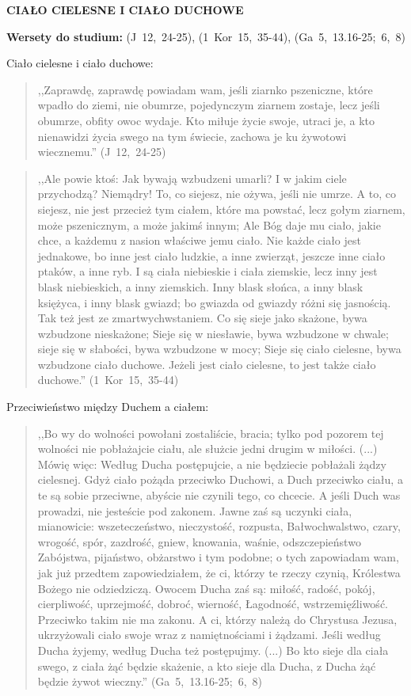 \documentclass[10pt,a4paper,oneside]{article}
\begin{document}
\centerline{\textbf{\MakeUppercase{Ciało cielesne i ciało duchowe}}}
\begin{center}
\textbf{Wersety do studium:} \mbox{(J 12, 24-25)}, \mbox{(1 Kor 15, 35-44)}, \mbox{(Ga 5, 13.16-25; 6, 8)}
\end{center}
Ciało cielesne i ciało duchowe:
\begin{quote}
,,Zaprawdę, zaprawdę powiadam wam, jeśli ziarnko pszeniczne, które wpadło do ziemi, nie obumrze, pojedynczym ziarnem zostaje, lecz jeśli obumrze, obfity owoc wydaje. Kto miłuje życie swoje, utraci je, a kto nienawidzi życia swego na tym świecie, zachowa je ku żywotowi wiecznemu.'' \mbox{(J 12, 24-25)}
\end{quote}
\begin{quote}
,,Ale powie ktoś: Jak bywają wzbudzeni umarli? I w jakim ciele przychodzą? Niemądry! To, co siejesz, nie ożywa, jeśli nie umrze. A to, co siejesz, nie jest przecież tym ciałem, które ma powstać, lecz gołym ziarnem, może pszenicznym, a może jakimś innym; Ale Bóg daje mu ciało, jakie chce, a każdemu z nasion właściwe jemu ciało. Nie każde ciało jest jednakowe, bo inne jest ciało ludzkie, a inne zwierząt, jeszcze inne ciało ptaków, a inne ryb. I są ciała niebieskie i ciała ziemskie, lecz inny jest blask niebieskich, a inny ziemskich. Inny blask słońca, a inny blask księżyca, i inny blask gwiazd; bo gwiazda od gwiazdy różni się jasnością. Tak też jest ze zmartwychwstaniem. Co się sieje jako skażone, bywa wzbudzone nieskażone; Sieje się w niesławie, bywa wzbudzone w chwale; sieje się w słabości, bywa wzbudzone w mocy; Sieje się ciało cielesne, bywa wzbudzone ciało duchowe. Jeżeli jest ciało cielesne, to jest także ciało duchowe.'' \mbox{(1 Kor 15, 35-44)}
\end{quote}

Przeciwieństwo między Duchem a ciałem:
\begin{quote}
,,Bo wy do wolności powołani zostaliście, bracia; tylko pod pozorem tej wolności nie pobłażajcie ciału, ale służcie jedni drugim w miłości. (...) Mówię więc: Według Ducha postępujcie, a nie będziecie pobłażali żądzy cielesnej. Gdyż ciało pożąda przeciwko Duchowi, a Duch przeciwko ciału, a te są sobie przeciwne, abyście nie czynili tego, co chcecie. A jeśli Duch was prowadzi, nie jesteście pod zakonem. Jawne zaś są uczynki ciała, mianowicie: wszeteczeństwo, nieczystość, rozpusta, Bałwochwalstwo, czary, wrogość, spór, zazdrość, gniew, knowania, waśnie, odszczepieństwo Zabójstwa, pijaństwo, obżarstwo i tym podobne; o tych zapowiadam wam, jak już przedtem zapowiedziałem, że ci, którzy te rzeczy czynią, Królestwa Bożego nie odziedziczą. Owocem Ducha zaś są: miłość, radość, pokój, cierpliwość, uprzejmość, dobroć, wierność, Łagodność, wstrzemięźliwość. Przeciwko takim nie ma zakonu. A ci, którzy należą do Chrystusa Jezusa, ukrzyżowali ciało swoje wraz z namiętnościami i żądzami. Jeśli według Ducha żyjemy, według Ducha też postępujmy. (...) Bo kto sieje dla ciała swego, z ciała żąć będzie skażenie, a kto sieje dla Ducha, z Ducha żąć będzie żywot wieczny.'' \mbox{(Ga 5, 13.16-25; 6, 8)}
\end{quote}
\end{document}
